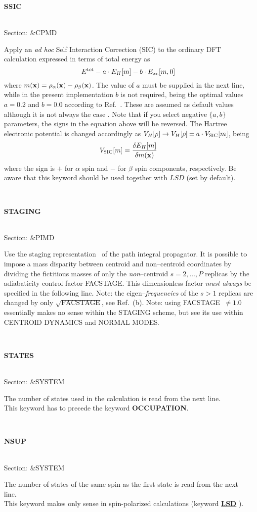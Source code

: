 \documentclass[twoside,10pt,titlepage,a4paper]{article}
\newcommand{\referto}[2]{\hyperlink{#1}{#2}}
\newcommand{\reflabel}[1]{\hypertarget{#1}}
\newcommand{\referto}[2]{\htmlref{#2}{#1}}
\newcommand{\reflabel}[1]{\label{#1}}
\newcommand{\keyword}[5]{%
\vspace{1.0cm}
\begin{minipage}{15cm}
\reflabel{#1}{\textbf{\large #1}}%
\index{#1}%
\ \textbf{#2}%
\ \textbf{#3}%
\ \textit{#4}%
     \hfill\\\smallskip
     {Section: #5}
     \hfill\\\smallskip\vskip 10pt
\end{minipage}
}%
\newcommand{\refkeyword}[1]{%
\referto{#1}{\textbf{#1}}%
\index{#1}%
}%
\newcommand{\desc}[1]{%
   \hspace*{\fill} \parbox{130mm}{\sloppy
                          {#1}%
                             }
     \hfill\\\smallskip
   }%
\newcommand{\desc}[1]{#1\vspace{1ex}}
\begin{document}
\keyword{SSIC}{}{}{}{\&CPMD}
  \desc{Apply an {\it ad hoc} Self Interaction Correction (SIC) to the 
        ordinary DFT calculation expressed in terms of total energy as
        \begin{equation*}
        E^{\rm tot}-a\cdot  E_H[m]- b\cdot E_{xc}[m, 0]
        \end{equation*}
        where $m({\bf x}) = \rho_\alpha({\bf x})-\rho_\beta({\bf x})$.
        The value of $a$ must be supplied in the next line, while
        in the present implementation $b$ is not required, being
        the optimal values $a=0.2$ and $b=0.0$ according to
        Ref.~\cite{SSIC}. These are assumed as default values
        although it is not always the case \cite{dna_sic}.
        Note that if you select negative $\{a, b \}$ parameters,
        the signs in the equation above will be reversed.
        The Hartree electronic potential is changed accordingly
        as $V_H[\rho] \to V_H[\rho] \pm a\cdot V_{\rm SIC}[m]$,
        being
        \begin{equation*}
        V_{\rm SIC}[m]=\frac{\delta E_H[m]}{\delta m({\bf x})}
        \end{equation*}
        where the sign is $+$ for $\alpha$ spin and $-$ for
        $\beta$ spin components, respectively.
        Be aware that this keyword should be used together with
        $LSD$ (set by default).}

\keyword{STAGING}{}{}{}{\&PIMD}
  \desc{Use the staging representation~\cite{Tuckerman96}
        of the path integral propagator. It is possible to impose a
        mass disparity between centroid and non--centroid coordinates by
        dividing the fictitious masses of only the {\em non}--centroid
        $s=2, \dots ,P$ replicas by
        the adiabaticity control factor FACSTAGE. This dimensionless
        factor {\em must always} be specified in the following line.
        Note: the eigen--{\em frequencies} of the $s>1$ replicas are changed
        by only $\sqrt{\mbox{FACSTAGE}}$, see Ref.~\cite{Martyna96}(b).
        Note: using FACSTAGE~$\not= 1.0$ essentially makes no sense
        within the STAGING scheme, but see its use within
        CENTROID DYNAMICS and NORMAL MODES.}

\keyword{STATES}{}{}{}{\&SYSTEM}
  \desc{The number of states used in the calculation is read
      from the next line. \\
      This keyword has to precede the keyword
      {\bf OCCUPATION}.}

\keyword{NSUP}{}{}{}{\&SYSTEM}
  \desc{The number of states of the same spin as the first state is read
      from the next line. \\
      This keyword makes only sense in spin-polarized calculations (keyword
      \refkeyword{LSD}).}
\end{document}
